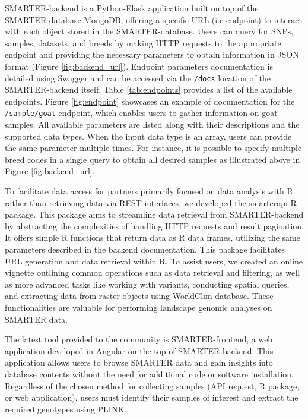 \documentclass[a4paper,num-refs,gigabyte]{oup-contemporary}
\begin{document}
SMARTER-backend is a Python-Flask application built on top of the SMARTER-database MongoDB, offering a specific URL (i.e endpoint) to interact with each object stored in the SMARTER-database. Users can query for SNPs, samples, datasets, and breeds by making HTTP requests to the appropriate endpoint and providing the necessary parameters to obtain information in JSON format (Figure \ref{fig:backend_url}).
Endpoint parameters documentation is detailed using Swagger and can be accessed via the \texttt{/docs} location of the SMARTER-backend itself. Table \ref{tab:endpoints} provides a list of the available endpoints.
Figure \ref{fig:endpoint} showcases an example of documentation for the \texttt{/sample/goat} endpoint, which enables users to gather information on goat samples. All available parameters are listed along with their descriptions and the supported data types. When the input data type is an array, users can provide the same parameter multiple times. For instance, it is possible to specify multiple breed codes in a single query to obtain all desired samples as illustrated above in Figure \ref{fig:backend_url}.

To facilitate data access for partners primarily focused on data analysis with R rather than retrieving data via REST interfaces, we developed the smarterapi R package\citep{RSMARTERAPI}. This package aims to streamline data retrieval from SMARTER-backend by abstracting the complexities of handling HTTP requests and result pagination. It offers simple R functions that return data as R data frames, utilizing the same parameters described in the backend documentation. This package facilitates URL generation and data retrieval within R.
To assist users, we created an online vignette outlining common operations such as data retrieval and filtering, as well as more advanced tasks like working with variants, conducting spatial queries, and extracting data from raster objects using WorldClim database\citep{Fick2017}. These functionalities are valuable for performing landscape genomic analyses on SMARTER data.

The latest tool provided to the community is SMARTER-frontend\citep{SMARTERfrontend}, a web application developed in Angular\citep{Angular} on the top of SMARTER-backend. This application allows users to browse SMARTER data and gain insights into database contents without the need for additional code or software installation. Regardless of the chosen method for collecting samples (API request, R package, or web application), users must identify their samples of interest and extract the required genotypes using PLINK.
\end{document}
